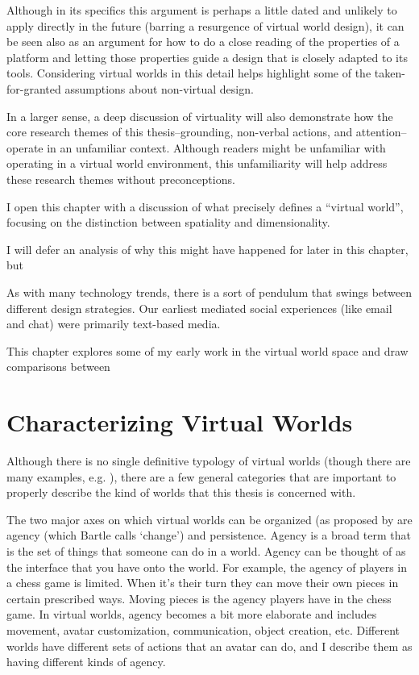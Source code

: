 Although in its specifics this argument is perhaps a little dated and unlikely to apply directly in the future (barring a resurgence of virtual world design), it can be seen also as an argument for how to do a close reading of the properties of a platform and letting those properties guide a design that is closely adapted to its tools. Considering virtual worlds in this detail helps highlight some of the taken-for-granted assumptions about non-virtual design.

In a larger sense, a deep discussion of virtuality will also demonstrate how the core research themes of this thesis--grounding, non-verbal actions, and attention--operate in an unfamiliar context. Although readers might be unfamiliar with operating in a virtual world environment, this unfamiliarity will help address these research themes without preconceptions.

I open this chapter with a discussion of what precisely defines a ``virtual world'', focusing on the distinction between spatiality and dimensionality. 






I will defer an analysis of why this might have happened for later in this chapter, but 


As with many technology trends, there is a sort of pendulum that swings between different design strategies. Our earliest mediated social experiences (like email and chat) were primarily text-based media. 



This chapter explores some of my early work in the virtual world space and draw comparisons between 


\section{Characterizing Virtual Worlds}

Although there is no single definitive typology of virtual worlds (though there are many examples, e.g. \citep{Koster:2007wg}), there are a few general categories that are important to properly describe the kind of worlds that this thesis is concerned with.

The two major axes on which virtual worlds can be organized (as proposed by \citet{Bartle:2003up} are agency (which Bartle calls `change') and persistence. Agency is a broad term that is the set of things that someone can do in a world. Agency can be thought of as the interface that you have onto the world. For example, the agency of players in a chess game is limited. When it’s their turn they can move their own pieces in certain prescribed ways. Moving pieces is the agency players have in the chess game. In virtual worlds, agency becomes a bit more elaborate and includes movement, avatar customization, communication, object creation, etc. Different worlds have different sets of actions that an avatar can do, and I describe them as having different kinds of agency.

